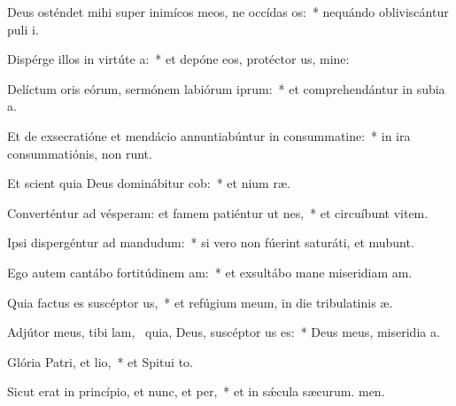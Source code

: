\item Deus osténdet mihi super inimícos meos, ne occídas os:~* nequándo obliviscántur puli i.
\item Dispérge illos in virtúte a:~* et depóne eos, protéctor us, mine:
\item Delíctum oris eórum, sermónem labiórum iprum:~* et comprehendántur in subia a.
\item Et de exsecratióne et mendácio annuntiabúntur in consummatine:~* in ira consummatiónis,  non runt.
\item Et scient quia Deus dominábitur cob:~* et nium ræ.
\item Converténtur ad vésperam: et famem patiéntur ut nes,~* et circuíbunt vitem.
\item Ipsi dispergéntur ad mandudum:~* si vero non fúerint saturáti, et mubunt.
\item Ego autem cantábo fortitúdinem am:~* et exsultábo mane miseridiam am.
\item Quia factus es suscéptor us,~* et refúgium meum, in die tribulatinis æ.
\item Adjútor meus, tibi lam,~\pscross{} quia, Deus, suscéptor us es:~* Deus meus, miseridia a.
\item Glória Patri, et lio,~* et Spitui to.
\item Sicut erat in princípio, et nunc, et per,~* et in sǽcula sæcurum. men.
